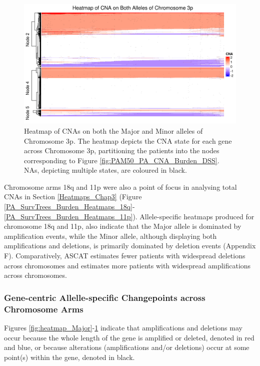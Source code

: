 \begin{figure}[H]
\centering
\includegraphics[width = 1\textwidth]{../figures/Chapter_6/Heatmap_Chr3p_Genes_Both_Alleles.png}
\caption[Heatmap of CNAs on both the Major and Minor alleles of Chromosome 3p.]{Heatmap of CNAs on both the Major and Minor alleles of Chromosome 3p. The heatmap depicts the CNA state for each gene across Chromosome 3p, partitioning the patients into the nodes corresponding to Figure \ref{fig:PAM50_PA_CNA_Burden_DSS}. NAs, depicting multiple states, are coloured in black.}
\label{fig:heatmap_Both}
\end{figure}

Chromosome arms 18q and 11p were also a point of focus in analysing total CNAs in Section \ref{Heatmaps_Chap3} (Figure \ref{PA_SurvTrees_Burden_Heatmaps_18q}-\ref{PA_SurvTrees_Burden_Heatmaps_11p}). Allele-specific heatmaps produced for chromosome 18q and 11p, also indicate that the Major allele is dominated by amplification events, while the Minor allele, although displaying both amplifications and deletions, is primarily dominated by deletion events (Appendix F). Comparatively, ASCAT estimates fewer patients with widespread deletions across chromosomes and estimates more patients with widespread amplifications across chromosomes.

\subsubsection{Gene-centric Allelle-specific Changepoints across Chromosome Arms}
Figures \ref{fig:heatmap_Major}-\ref{fig:heatmap_Both} indicate that amplifications and deletions may occur because the whole length of the gene is amplified or deleted, denoted in red and blue, or because alterations (amplifications and/or deletions) occur at some point(s) within the gene, denoted in black. 

